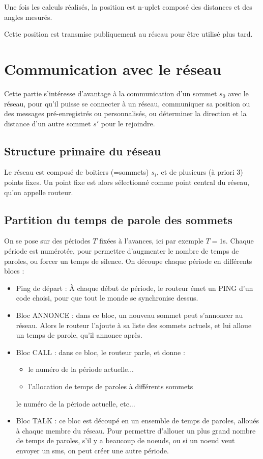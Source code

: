 \documentclass{article}
\begin{document}
Une fois les calculs réalisés, la position est n-uplet composé des distances et des angles mesurés.

Cette position est transmise publiquement au réseau pour être utilisé plus tard.


\section{Communication avec le réseau}

Cette partie s'intéresse d'avantage à la communication d'un sommet $s_0$ avec le réseau, pour qu'il puisse se connecter à un réseau, communiquer sa position ou des messages pré-enregistrés ou personnalisés, ou déterminer la direction et la distance d'un autre sommet $s'$ pour le rejoindre.

\subsection{Structure primaire du réseau}

Le réseau est composé de boitiers (=sommets) $s_i$, et de plusieurs (à priori 3) points fixes. Un point fixe est alors sélectionné comme point central du réseau, qu'on appelle routeur.


\subsection{Partition du temps de parole des sommets}


On se pose sur des périodes $T$ fixées à l'avances, ici par exemple $T=1$s. Chaque période est numérotée, pour permettre d'augmenter le nombre de temps de paroles, ou forcer un temps de silence. On découpe chaque période en différents blocs :



\begin{itemize}
    \item Ping de départ : À chaque début de période, le routeur émet un PING d'un code choisi, pour que tout le monde se synchronise dessus.
    \item Bloc ANNONCE : dans ce bloc, un nouveau sommet peut s'annoncer au réseau. Alors le routeur l'ajoute à sa liste des sommets actuels, et lui alloue un temps de parole, qu'il annonce après.
    \item Bloc CALL : dans ce bloc, le routeur parle, et donne :
    \begin{itemize}
        \item le numéro de la période actuelle...
        \item l'allocation de temps de paroles à différents sommets
    \end{itemize}
    le numéro de la période actuelle, etc...
    \item Bloc TALK : ce bloc est découpé en un ensemble de temps de paroles, alloués à chaque membre du réseau. Pour permettre d'allouer un plus grand nombre de temps de paroles, s'il y a beaucoup de noeuds, ou si un noeud veut envoyer un sms, on peut créer une autre période.
\end{itemize}
\end{document}
